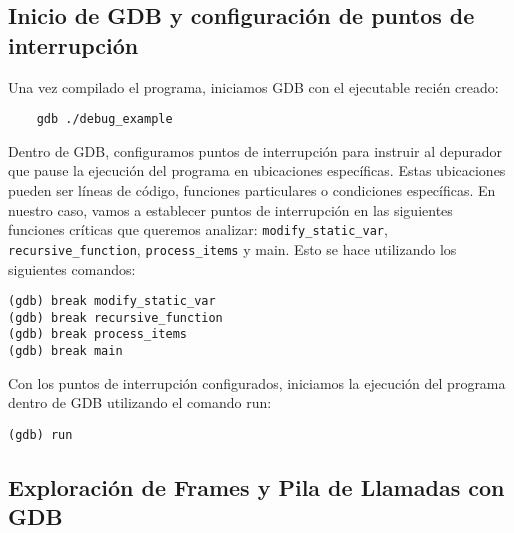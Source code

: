 \documentclass[12pt,a4paper]{article}
\begin{document}
\subsection{Inicio de GDB y configuración de puntos de interrupción}
Una vez compilado el programa, iniciamos GDB con el ejecutable recién creado:
\begin{verbatim}
	gdb ./debug_example
\end{verbatim}
Dentro de GDB, configuramos puntos de interrupción para instruir al depurador que pause la ejecución del programa en ubicaciones específicas. Estas ubicaciones pueden ser líneas de código, funciones particulares o condiciones específicas. En nuestro caso, vamos a establecer puntos de interrupción en las siguientes funciones críticas que queremos analizar: \texttt{modify\_static\_var}, \texttt{recursive\_function}, \texttt{process\_items} y main. Esto se hace utilizando los siguientes comandos:
\begin{verbatim}
(gdb) break modify_static_var
(gdb) break recursive_function
(gdb) break process_items
(gdb) break main
\end{verbatim}
Con los puntos de interrupción configurados, iniciamos la ejecución del programa dentro de GDB utilizando el comando run:
\begin{verbatim}
(gdb) run
\end{verbatim}

\subsection{Exploración de Frames y Pila de Llamadas con GDB}
\end{document}
